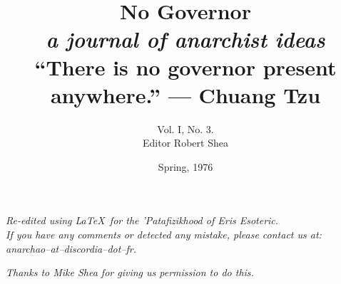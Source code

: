 \documentclass[12pt, onecolumn, letterpaper, oneside]{book}
\title{No Governor\\
		\large \textit{a journal of anarchist ideas}\\
		\vspace{2\baselineskip}
		\normalsize ``There is no governor present anywhere.'' --- Chuang Tzu
		}
\author{Vol. I, No. 3.\\Editor Robert Shea}
\date{Spring, 1976}
\begin{document}
\sloppy

\maketitle

\vspace*{\fill}

\begin{flushright}
\emph{Re-edited using \LaTeX $\,$ for the 'Patafizikhood of Eris Esoteric.\\
If you have any comments or detected any mistake, please contact us at:\\
anarchao--at--discordia--dot--fr.\\}
\end{flushright}

\begin{flushright}
\emph{Thanks to Mike Shea for giving us permission to do this.}
\end{flushright}

\vspace*{\fill}

\tableofcontents
















\end{document}
